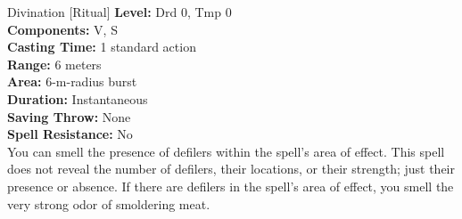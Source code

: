 {Divination [Ritual]}
{
	\textbf{Level:}
	Drd 0, Tmp 0\\
	\textbf{Components:}
	V, S\\
	\textbf{Casting Time:}
	1 standard action\\
	\textbf{Range:}
	6 meters\\
	\textbf{Area:}
	6-m-radius burst\\
	\textbf{Duration:}
	Instantaneous\\
	\textbf{Saving Throw:}
	None\\
	\textbf{Spell Resistance:}
	No\\
}
{
	You can smell the presence of defilers within the spell's area of effect. This spell does not reveal the number of defilers, their locations, or their strength; just their presence or absence. If there are defilers in the spell's area of effect, you smell the very strong odor of smoldering meat.
}
